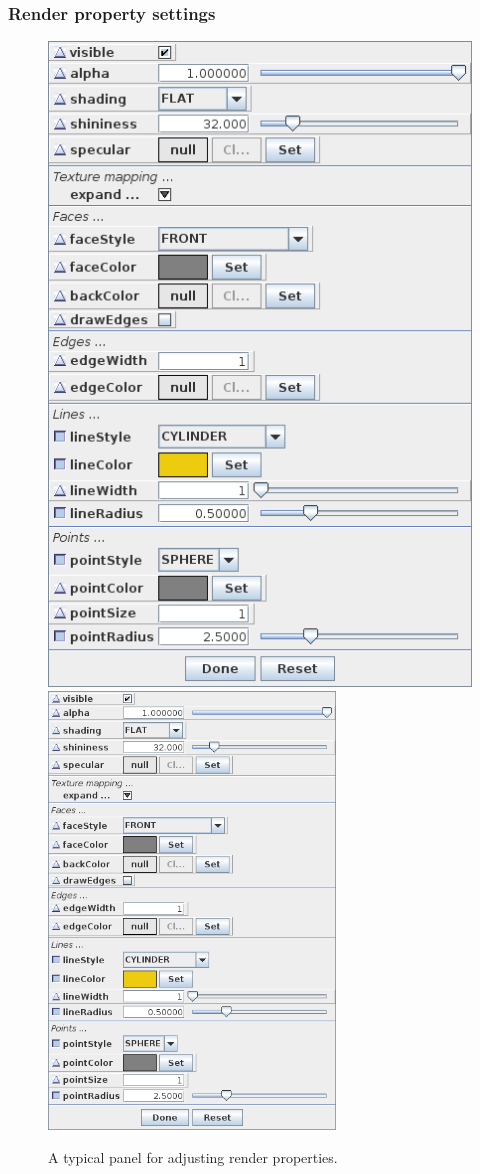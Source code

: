 \documentclass{article}
\begin{document}
\subsubsection{Render property settings}
\label{renderPropSettingsSec}

\begin{figure}[h]
\begin{center}
\iflatexml
\includegraphics[]{images/renderProps}
\else
\includegraphics[width=3in]{images/renderProps}
\fi
\end{center}
\caption{A typical panel for adjusting render properties.}%
\label{renderpropsFig}
\end{figure}
\end{document}
